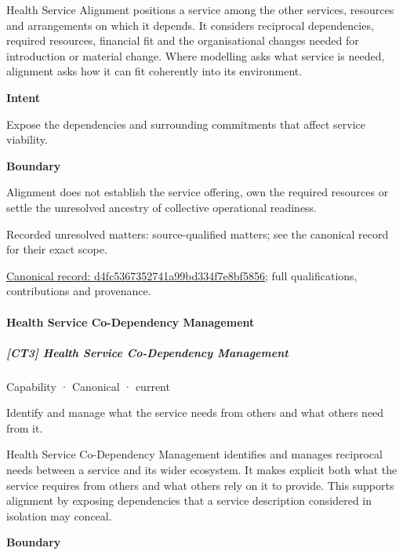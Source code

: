 Health Service Alignment positions a service among the other services, resources and arrangements on which it depends. It considers reciprocal dependencies, required resources, financial fit and the organisational changes needed for introduction or material change. Where modelling asks what service is needed, alignment asks how it can fit coherently into its environment.



\textbf{Intent}



Expose the dependencies and surrounding commitments that affect service viability.



\textbf{Boundary}



Alignment does not establish the service offering, own the required resources or settle the unresolved ancestry of collective operational readiness.


{\small Recorded unresolved matters: source-qualified matters; see the canonical record for their exact scope.}\par
{\footnotesize \href{../../../../continuum/strategy/capability/d4fc5367352741a99bd334f7e8bf5856.md}{Canonical record: d4fc5367352741a99bd334f7e8bf5856}; full qualifications, contributions and provenance.}\par
\paragraph{Health Service Co-Dependency Management}

\subparagraph{[CT3] Health Service Co-Dependency Management}

\label{element:f031ee3ddc5e47c48d4308d4077b3967}
{\small Capability · Canonical · current}\par

Identify and manage what the service needs from others and what others need from it.



Health Service Co-Dependency Management identifies and manages reciprocal needs between a service and its wider ecosystem. It makes explicit both what the service requires from others and what others rely on it to provide. This supports alignment by exposing dependencies that a service description considered in isolation may conceal.



\textbf{Boundary}



